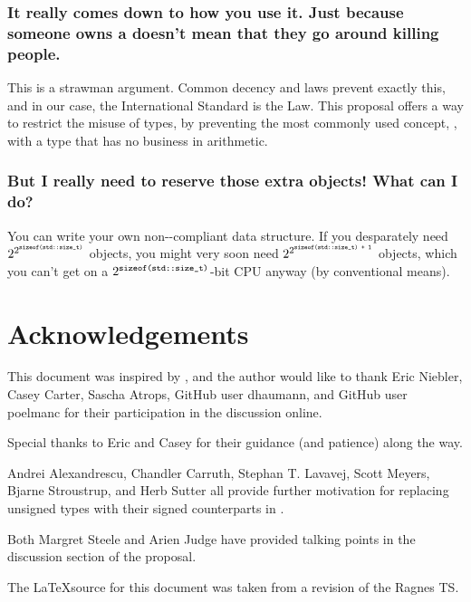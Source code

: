 \subsubsection*{It really comes down to how you use it. Just because someone owns a
 doesn't mean that they go around killing people.}
This is a strawman argument. Common decency and laws prevent exactly this, and in our case, the
International Standard is the Law. This proposal offers a way to restrict the misuse of types, by
preventing the most commonly used concept, , with a type that has no business
in arithmetic.

\subsubsection*{But I really need to reserve those extra objects! What can I do?}
You can write your own non--compliant data structure. If you desparately need
$2^{2^{\texttt{sizeof(std::size\_t)}}}$ objects, you might very soon need
$2^{2^{\texttt{sizeof(std::size\_t) + 1}}}$ objects, which you can't get on a
$2^{\texttt{sizeof(std::size\_t)}}$-bit CPU anyway (by conventional means)\cite{niebler16}.

\section*{Acknowledgements}
This document was inspired by \cite{niebler16}, and the author would like to thank Eric Niebler,
Casey Carter, Sascha Atrops, GitHub user dhaumann, and GitHub user poelmanc for their participation
in the discussion online.

Special thanks to Eric and Casey for their guidance (and patience) along the way.

Andrei Alexandrescu, Chandler Carruth, Stephan T. Lavavej, Scott Meyers, Bjarne Stroustrup, and Herb
Sutter all provide further motivation for replacing unsigned types with their signed counterparts in
\cite{panel}.

Both Margret Steele and Arien Judge have provided talking points in the discussion section of the
proposal.

The \LaTeX  source for this document was taken from a revision of the Ragnes TS.

